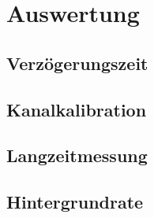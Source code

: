 \newpage
\section{Auswertung}

\subsection{Verzögerungszeit}

\subsection{Kanalkalibration}

\subsection{Langzeitmessung}

\subsection{Hintergrundrate}
